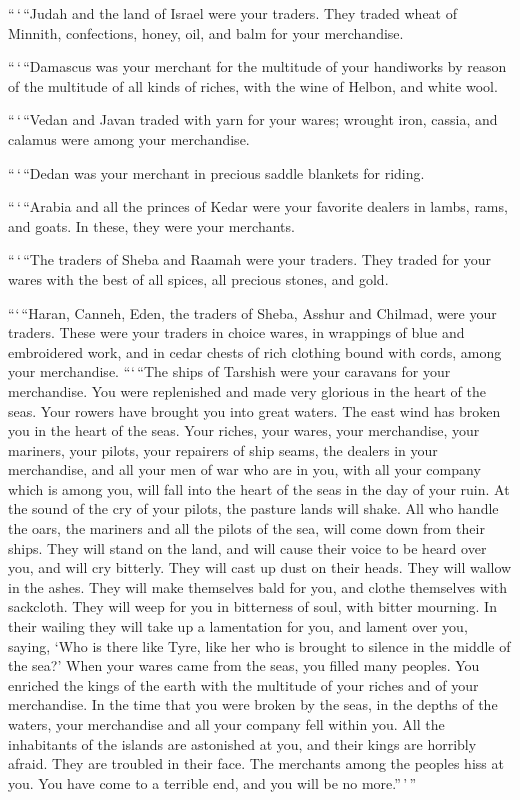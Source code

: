  ``\,`\,``Judah and the land of Israel were your traders.
They traded wheat of Minnith, confections, honey, oil, and balm for your
merchandise.

 ``\,`\,``Damascus was your merchant for the multitude of
your handiworks by reason of the multitude of all kinds of riches, with
the wine of Helbon, and white wool.

 ``\,`\,``Vedan and Javan traded with yarn for your wares;
wrought iron, cassia, and calamus were among your merchandise.

 ``\,`\,``Dedan was your merchant in precious saddle
blankets for riding.

 ``\,`\,``Arabia and all the princes of Kedar were your
favorite dealers in lambs, rams, and goats. In these, they were your
merchants.

 ``\,`\,``The traders of Sheba and Raamah were your
traders. They traded for your wares with the best of all spices, all
precious stones, and gold.

 ```\,``Haran, Canneh, Eden, the traders of Sheba, Asshur
and Chilmad, were your traders.  These were your traders in
choice wares, in wrappings of blue and embroidered work, and in cedar
chests of rich clothing bound with cords, among your merchandise.
 ```\,``The ships of Tarshish were your caravans for your
merchandise. You were replenished and made very glorious in the heart of
the seas.  Your rowers have brought you into great waters.
The east wind has broken you in the heart of the seas. 
Your riches, your wares, your merchandise, your mariners, your pilots,
your repairers of ship seams, the dealers in your merchandise, and all
your men of war who are in you, with all your company which is among
you, will fall into the heart of the seas in the day of your ruin.
 At the sound of the cry of your pilots, the pasture lands
will shake.  All who handle the oars, the mariners and all
the pilots of the sea, will come down from their ships. They will stand
on the land,  and will cause their voice to be heard over
you, and will cry bitterly. They will cast up dust on their heads. They
will wallow in the ashes.  They will make themselves bald
for you, and clothe themselves with sackcloth. They will weep for you in
bitterness of soul, with bitter mourning.  In their wailing
they will take up a lamentation for you, and lament over you, saying,
`Who is there like Tyre, like her who is brought to silence in the
middle of the sea?'  When your wares came from the seas,
you filled many peoples. You enriched the kings of the earth with the
multitude of your riches and of your merchandise.  In the
time that you were broken by the seas, in the depths of the waters, your
merchandise and all your company fell within you.  All the
inhabitants of the islands are astonished at you, and their kings are
horribly afraid. They are troubled in their face.  The
merchants among the peoples hiss at you. You have come to a terrible
end, and you will be no more.''\,'\,''

